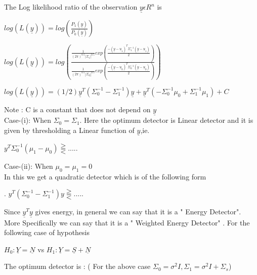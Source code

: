 \documentclass[12pt]{report}
\begin{document}
	\noindent The Log likelihood ratio of the observation $\underline{y}\epsilon R^n$ is\\
	\begin{center}
		$log(L(\underline{y}))=log(\frac{P_1(\underline{y})}{P_0(\underline{y})})$
	\end{center}
	
	\begin{center}
		$log(L(\underline{y}))=log(\frac{\frac{1}{(2\pi)^{0.5}|\Sigma_1|^0.5}exp(\frac{-(\underline{y}-\underline{u}_1)^T\Sigma_1^{-1}(\underline{y}-\underline{u}_1)}{2})}{\frac{1}{(2\pi)^{0.5}|\Sigma_0|^0.5}exp(\frac{-(\underline{y}-\underline{u}_0)^T\Sigma_0^{-1}(\underline{y}-\underline{u}_0)}{2})})$
	\end{center}
	
	
	\begin{center}
		$log(L(\underline{y}))=(1/2) \underline{y}^T(\Sigma_0^{-1}-\Sigma_1^{-1}) \underline{y}+\underline{y}^T(-\Sigma_0^{-1}\mu_0+\Sigma_1^{-1}\mu_1)+C$\\
	\end{center}
	
	\noindent Note : C is a constant that does not depend on $\underline{y}$\\
	
	\noindent Case-(i): When $\Sigma_0=\Sigma_1$.
	\noindent Here the optimum detector is Linear detector and it is given by thresholding a Linear function of $\underline{y}$,ie.
	\begin{center}
		$ y^T\Sigma_0^{-1}(\mu_1-\mu_0)\gtreqqless $.....
	\end{center}
	\noindent Case-(ii):  When $\mu_0=\mu_1=0$\\
	In this we get  a quadratic detector which is of the following form
	\begin{center}        
		. $y^T(\Sigma_0^{-1}-\Sigma_1^{-1})y\gtreqqless $.....
	\end{center}
	Since $\underline{y}^T\underline{y}$ gives energy, in general we can say that it is a " Energy Detector".  More Specifically we can say that it is a " Weighted Energy Detector" . For the following case of hypothesis \\
	\begin{center}
		$H_0 :  \underline{Y}  =   \underline{N}$
		\linebreak
		vs 
		\linebreak
		$H_1 : \underline{Y} =  \underline{S}+ \underline{N}$
	\end{center}
	The optimum detector is : ( For the above case $ \Sigma_0=\sigma^2I,\Sigma_1=\sigma^2I+\Sigma_s$)\\
	
\end{document}
